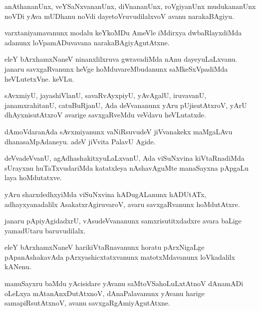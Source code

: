 \documentclass{article}
\begin{document}
\begin{mn}%
anAthananUnx, veYSaNxvananUnx, diVnananUnx, roVgiyanUnx mudukananUnx noVDi yAva mUDhanu 
noVdi dayetoVruvudilalxvoV avanu narakaBAgiyu.
\end{mn}

\begin{mn}%
varxtaniyamavanunx modalu keYkoMDu AmeVle iMdirxya dwbaRlayxdiMda adanunx loVpamADuvavana 
narakaBAgiyAgutAtxne.
\end{mn}

\begin{mn}%
eleY bArxhamxNaneV ninanxlilxruva gwravadiMda nAnu dayeyuLaLxvanu. janaru savxgaRvanunx 
heVge hoMduvareMbudanunx saMkeSxVpadiMda heVLutetxVne. keVLu.
\end{mn}

\begin{mn}%
sAvxmiyU, jayashiVlanU, savaRvAyxpiyU, yAvAgalU, iruvavanU, janamxrahitanU, catuBuRjanU, 
Ada deVvananunx yAru pUjisutAtxroV, yArU dhAyxnisutAtxroV avarige savxgaRveMdu veVdavu 
heVLutatxde.
\end{mn}

\begin{mn}%
dAmoVdaranAda sAvxmiyanunx vaNiRsuvudeV jiVvanakekx maMgaLAvu dhanasaMpAdaneyu. adeV 
jiVvita PalavU Agide.
\end{mn}

\begin{mn}%
deVvadeVvanU, agAdhashakitxyuLaLxvanU, Ada viSuNxvina kiVtaRnadiMda sUrayxnu 
huTaTxvudariMda katatxleya nAshavAguMte manaSayxna pApgaLu laya hoMdutatxve.
\end{mn}

\begin{mn}%
yAru sharxdedhxyiMda viSuNxvina hADugALanunx hADUtATx, adhayxyanadalilx 
AsakatxrAgiruvaroV, avaru savxgaRvanunx hoMdutAtxre.
\end{mn}

\begin{mn}%
janaru pApiyAgidadxrU, vAsudeVvananunx samxrisutitxdadxre avara baLige yamadUtaru 
baruvudilalx.
\end{mn}

\begin{mn}%
eleY bArxhamxNaneV harikiVtaRnavanunx horatu pArxNigaLge pApanAshakavAda 
pArxyashicxtatxvanunx matotxMdavanunx loVkadalilx kANenu.
\end{mn}

\begin{mn}%
manuSayxru baMdu yAcisidare yAvanu saMtoVSahoLuLxtAtnoV dAnamADi oLeLxya 
mAtanAnxDutAtxnoV, dAnaPalavanunx yAvanu harige samapiRsutAtxnoV, avanu 
savxgaRgAmiyAgutAtxne.
\end{mn}
\end{document}
